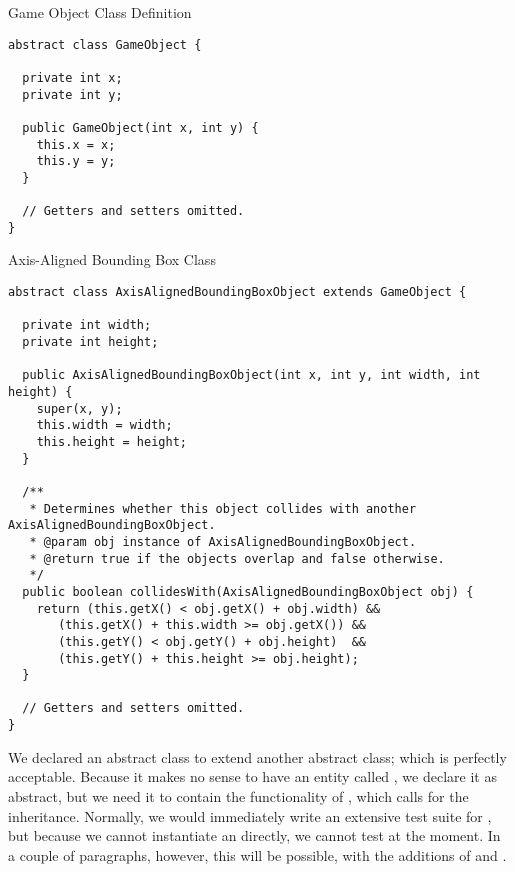 \begin{cl}[]{Game Object Class Definition}
\begin{lstlisting}[language=MyJava]
abstract class GameObject {
  
  private int x;
  private int y;

  public GameObject(int x, int y) {
    this.x = x;
    this.y = y;
  }

  // Getters and setters omitted.
}
\end{lstlisting}
\end{cl}

\begin{cl}[]{Axis-Aligned Bounding Box Class}
\begin{lstlisting}[language=Myjava]
abstract class AxisAlignedBoundingBoxObject extends GameObject {
  
  private int width;
  private int height;

  public AxisAlignedBoundingBoxObject(int x, int y, int width, int height) {
    super(x, y);
    this.width = width;
    this.height = height;
  }

  /**
   * Determines whether this object collides with another AxisAlignedBoundingBoxObject.
   * @param obj instance of AxisAlignedBoundingBoxObject.
   * @return true if the objects overlap and false otherwise.
   */
  public boolean collidesWith(AxisAlignedBoundingBoxObject obj) {
    return (this.getX() < obj.getX() + obj.width) &&
	   (this.getX() + this.width >= obj.getX()) &&
 	   (this.getY() < obj.getY() + obj.height)  &&
	   (this.getY() + this.height >= obj.height); 
  }
  
  // Getters and setters omitted.
}
\end{lstlisting}
\end{cl}

We declared an abstract class to extend another abstract class; which is perfectly acceptable. Because it makes no sense to have an entity called , we declare it as abstract, but we need it to contain the functionality of , which calls for the inheritance. Normally, we would immediately write an extensive test suite for , but because we cannot instantiate an  directly, we cannot test  at the moment. In a couple of paragraphs, however, this will be possible, with the additions of  and .

